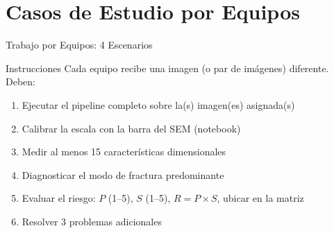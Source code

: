 \documentclass[aspectratio=169,12pt]{beamer}
\begin{document}
\section{Casos de Estudio por Equipos}

\begin{frame}{Trabajo por Equipos: 4 Escenarios}
	\begin{block}{Instrucciones}
		Cada equipo recibe una imagen (o par de imágenes) diferente. Deben:
		\begin{enumerate}
			\item Ejecutar el pipeline completo sobre la(s) imagen(es) asignada(s)
			\item Calibrar la escala con la barra del SEM (notebook)
			\item Medir al menos 15 características dimensionales
			\item Diagnosticar el modo de fractura predominante
			\item Evaluar el riesgo: $P$ (1--5), $S$ (1--5),
			      $R = P \times S$, ubicar en la matriz
			\item Resolver 3 problemas adicionales
		\end{enumerate}
	\end{block}
\end{frame}
\end{document}

